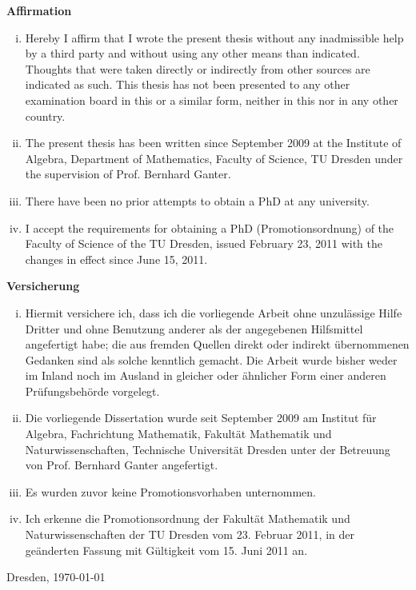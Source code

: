 \cleardoublepage
\thispagestyle{empty}

\begin{flushright}
  \LARGE\bfseries Affirmation
\end{flushright}
\medskip

\begin{enumerate}[i. ]
\item Hereby I affirm that I wrote the present thesis without any inadmissible help by a
  third party and without using any other means than indicated. Thoughts that were taken
  directly or indirectly from other sources are indicated as such. This thesis has not
  been presented to any other examination board in this or a similar form, neither in this
  nor in any other country.

\item The present thesis has been written since September 2009 at the Institute of
  Algebra, Department of Mathematics, Faculty of Science, TU Dresden under the supervision
  of Prof. Bernhard Ganter.

\item There have been no prior attempts to obtain a PhD at any university.

\item I accept the requirements for obtaining a PhD (Promotionsordnung) of the Faculty of
  Science of the TU Dresden, issued February 23, 2011 with the changes in effect since June
  15, 2011.
\end{enumerate}


\begin{flushright}
  \LARGE\bfseries Versicherung
\end{flushright}
\medskip

\begin{enumerate}[i. ]
\item Hiermit versichere ich, dass ich die vorliegende Arbeit ohne unzulässige Hilfe
  Dritter und ohne Benutzung anderer als der angegebenen Hilfsmittel angefertigt habe; die
  aus fremden Quellen direkt oder indirekt übernommenen Gedanken sind als solche kenntlich
  gemacht. Die Arbeit wurde bisher weder im Inland noch im Ausland in gleicher oder
  ähnlicher Form einer anderen Prüfungsbehörde vorgelegt.

\item Die vorliegende Dissertation wurde seit September 2009 am Institut für Algebra,
  Fachrichtung Mathematik, Fakultät Mathematik und Naturwissenschaften, Technische
  Universität Dresden unter der Betreuung von Prof. Bernhard Ganter angefertigt.

\item Es wurden zuvor keine Promotionsvorhaben unternommen.

\item Ich erkenne die Promotionsordnung der Fakultät Mathematik und Naturwissenschaften
  der TU Dresden vom 23. Februar 2011, in der geänderten Fassung mit Gültigkeit vom
  15. Juni 2011 an.
\end{enumerate}


\vfill

Dresden, \today

